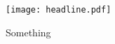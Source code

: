 \begin{figure}[t]
    \centering
    \texttt{[image: headline.pdf]}
    \caption{Something}
    \label{fig:headline}
\end{figure}

